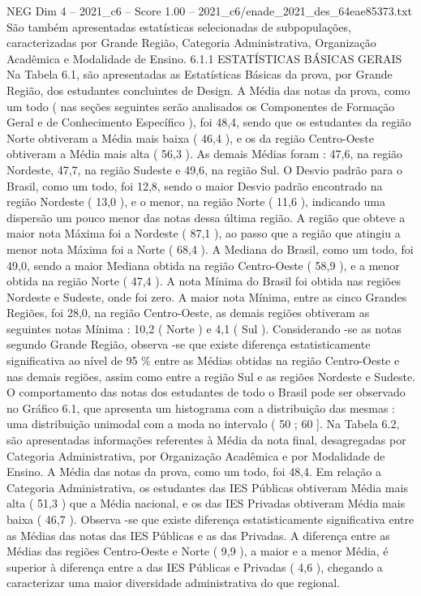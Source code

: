 \begin{textsample}{NEG Dim 4 – 2021\_c6 – Score 1.00 – 2021\_c6/enade\_2021\_des\_64eae85373.txt}
São também apresentadas estatísticas selecionadas de subpopulações, caracterizadas por Grande Região, Categoria Administrativa, Organização Acadêmica e Modalidade de Ensino. 6.1.1 ESTATÍSTICAS BÁSICAS GERAIS Na Tabela 6.1, são apresentadas as Estatísticas Básicas da prova, por Grande Região, dos estudantes concluintes de Design.
A Média das notas da prova, como um todo ( nas seções seguintes serão analisados os Componentes de Formação Geral e de Conhecimento Específico ), foi 48,4, sendo que os estudantes da região Norte obtiveram a Média mais baixa ( 46,4 ), e os da região Centro-Oeste obtiveram a Média mais alta ( 56,3 ).
As demais Médias foram : 47,6, na região Nordeste, 47,7, na região Sudeste e 49,6, na região Sul.
O Desvio padrão para o Brasil, como um todo, foi 12,8, sendo o maior Desvio padrão encontrado na região Nordeste ( 13,0 ), e o menor, na região Norte ( 11,6 ), indicando uma dispersão um pouco menor das notas dessa última região.
A região que obteve a maior nota Máxima foi a Nordeste ( 87,1 ), ao passo que a região que atingiu a menor nota Máxima foi a Norte ( 68,4 ).
A Mediana do Brasil, como um todo, foi 49,0, sendo a maior Mediana obtida na região Centro-Oeste ( 58,9 ), e a menor obtida na região Norte ( 47,4 ).
A nota Mínima do Brasil foi obtida nas regiões Nordeste e Sudeste, onde foi zero.
A maior nota Mínima, entre as cinco Grandes Regiões, foi 28,0, na região Centro-Oeste, as demais regiões obtiveram as seguintes notas Mínima : 10,2 ( Norte ) e 4,1 ( Sul ).
Considerando -se as notas segundo Grande Região, observa -se que existe diferença estatisticamente significativa ao nível de 95 \% entre as Médias obtidas na região Centro-Oeste e nas demais regiões, assim como entre a região Sul e as regiões Nordeste e Sudeste.
O comportamento das notas dos estudantes de todo o Brasil pode ser observado no Gráfico 6.1, que apresenta um histograma com a distribuição das mesmas : uma distribuição unimodal com a moda no intervalo ( 50 ; 60 ].
Na Tabela 6.2, são apresentadas informações referentes à Média da nota final, desagregadas por Categoria Administrativa, por Organização Acadêmica e por Modalidade de Ensino.
A Média das notas da prova, como um todo, foi 48,4.
Em relação a Categoria Administrativa, os estudantes das IES Públicas obtiveram Média mais alta ( 51,3 ) que a Média nacional, e os das IES Privadas obtiveram Média mais baixa ( 46,7 ).
Observa -se que existe diferença estatisticamente significativa entre as Médias das notas das IES Públicas e as das Privadas.
A diferença entre as Médias das regiões Centro-Oeste e Norte ( 9,9 ), a maior e a menor Média, é superior à diferença entre a das IES Públicas e Privadas ( 4,6 ), chegando a caracterizar uma maior diversidade administrativa do que regional.

\end{textsample}
